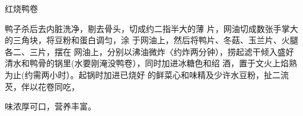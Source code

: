 \begin{recipe}{红烧鸭卷}

\ingredients







\cooking

鸭子杀后去内脏洗净，剔去骨头，切成约二指半大的薄 片，网油切成数张手掌大的三角块，将豆粉和蛋白调匀，涂 于网油上，然后将鸭片、冬菇、玉兰片、火腿各二、三片，摆在 网油上，分别以沸油微炸〈约炸两分钟），捞起滤干倾入盛好 清水和鸭骨的锅里(水要刚淹没鸭卷），同时加进冰糖色和绍 酒，置于文火上焰熟为止(约需两小时）。起锅时加进已烧好 的鲜菜心和味精及少许水豆粉，扯二流芡，伴以花卷同吃，

\notes

味浓厚可口，营养丰富。

\end{recipe}

